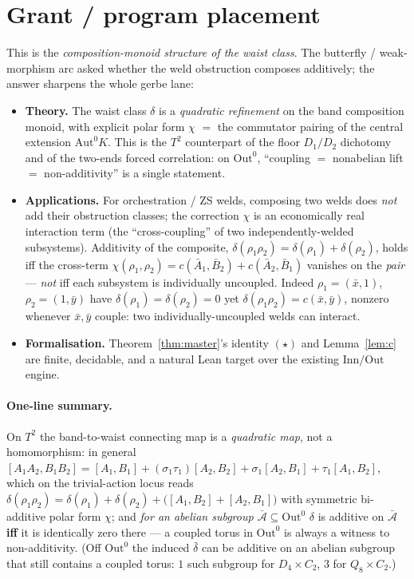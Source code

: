 \documentclass[11pt]{article}
\theoremstyle{definition}
\newcommand{\Aut}{\mathrm{Aut}}
\newcommand{\Inn}{\mathrm{Inn}}
\newcommand{\Out}{\mathrm{Out}}
\newcommand{\Ab}{\bar{\mathcal{A}}}
\begin{document}
\section{Grant / program placement}\label{sec:grant}

This is the \emph{composition-monoid structure of the waist class}. The butterfly /
weak-morphism arc asked whether the weld obstruction composes additively; the answer
sharpens the whole gerbe lane:
\begin{itemize}
\item \textbf{Theory.} The waist class $\delta$ is a \emph{quadratic refinement} on the
band composition monoid, with explicit polar form $\chi$ $=$ the commutator pairing of
the central extension $\Aut^0K$. This is the $T^2$ counterpart of the floor $D_1/D_2$
dichotomy and of the two-ends forced correlation: on $\Out^0$, ``coupling $=$ nonabelian lift $=$
non-additivity'' is a single statement.
\item \textbf{Applications.} For orchestration / ZS welds, composing two welds does
\emph{not} add their obstruction classes; the correction $\chi$ is an economically real
interaction term (the ``cross-coupling'' of two independently-welded subsystems).
Additivity of the composite, $\delta(\rho_1\rho_2)=\delta(\rho_1)+\delta(\rho_2)$, holds
iff the cross-term $\chi(\rho_1,\rho_2)=c(\bar A_1,\bar B_2)+c(\bar A_2,\bar B_1)$
vanishes on the \emph{pair} --- \emph{not} iff each subsystem is individually uncoupled.
Indeed $\rho_1=(\bar x,1)$, $\rho_2=(1,\bar y)$ have $\delta(\rho_1)=\delta(\rho_2)=0$
yet $\delta(\rho_1\rho_2)=c(\bar x,\bar y)$, nonzero whenever $\bar x,\bar y$ couple: two
individually-uncoupled welds can interact.
\item \textbf{Formalisation.} Theorem~\ref{thm:master}'s identity $(\star)$ and
Lemma~\ref{lem:c} are finite, decidable, and a natural Lean target over the existing
$\Inn/\Out$ engine.
\end{itemize}

\paragraph{One-line summary.}
On $T^2$ the band-to-waist connecting map is a \emph{quadratic map}, not a homomorphism:
in general
$[A_1A_2,B_1B_2]=[A_1,B_1]+(\sigma_1\tau_1)[A_2,B_2]+\sigma_1[A_2,B_1]+\tau_1[A_1,B_2]$,
which on the trivial-action locus reads
$\delta(\rho_1\rho_2)=\delta(\rho_1)+\delta(\rho_2)+\big([A_1,B_2]+[A_2,B_1]\big)$ with
symmetric bi-additive polar form $\chi$; and \emph{for an abelian subgroup
$\Ab\subseteq\Out^0$} $\delta$ is additive on $\Ab$ \textbf{iff} it is identically zero
there --- a coupled torus in $\Out^0$ is always a witness to non-additivity. (Off
$\Out^0$ the induced $\bar\delta$ can be additive on an abelian subgroup that still
contains a coupled torus: $1$ such subgroup for $D_4\times C_2$, $3$ for
$Q_8\times C_2$.)
\end{document}
